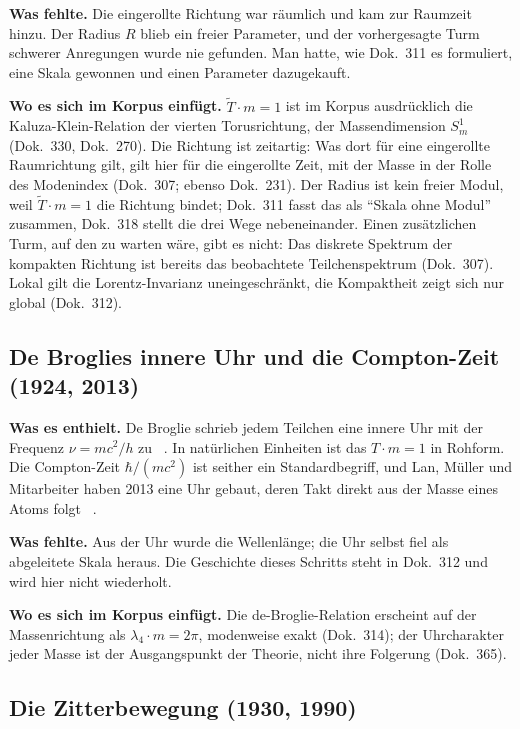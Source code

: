 \textbf{Was fehlte.} Die eingerollte Richtung war räumlich und kam zur Raumzeit hinzu. Der Radius
$R$ blieb ein freier Parameter, und der vorhergesagte Turm schwerer Anregungen wurde nie gefunden.
Man hatte, wie Dok.~311 es formuliert, eine Skala gewonnen und einen Parameter dazugekauft.

\textbf{Wo es sich im Korpus einfügt.} $\tilde T\cdot m=1$ ist im Korpus ausdrücklich die
Kaluza-Klein-Relation der vierten Torusrichtung, der Massendimension $S^1_m$ (Dok.~330, Dok.~270).
Die Richtung ist zeitartig: Was dort für eine eingerollte Raumrichtung gilt, gilt hier für die
eingerollte Zeit, mit der Masse in der Rolle des Modenindex (Dok.~307; ebenso Dok.~231). Der
Radius ist kein freier Modul, weil $\tilde T\cdot m=1$ die Richtung bindet; Dok.~311 fasst das als
\enquote{Skala ohne Modul} zusammen, Dok.~318 stellt die drei Wege nebeneinander. Einen
zusätzlichen Turm, auf den zu warten wäre, gibt es nicht: Das diskrete Spektrum der kompakten
Richtung ist bereits das beobachtete Teilchenspektrum (Dok.~307). Lokal gilt die
Lorentz-Invarianz uneingeschränkt, die Kompaktheit zeigt sich nur global (Dok.~312).

\subsection{De Broglies innere Uhr und die Compton-Zeit (1924, 2013)}

\textbf{Was es enthielt.} De Broglie schrieb jedem Teilchen eine innere Uhr mit der Frequenz
$\nu=mc^2/h$ zu \QM~\cite{deBroglie1925}. In natürlichen Einheiten ist das $T\cdot m=1$ in Rohform.
Die Compton-Zeit $\hbar/(mc^2)$ ist seither ein Standardbegriff, und Lan, Müller und Mitarbeiter
haben 2013 eine Uhr gebaut, deren Takt direkt aus der Masse eines Atoms folgt
\QM~\cite{Lan2013}.

\textbf{Was fehlte.} Aus der Uhr wurde die Wellenlänge; die Uhr selbst fiel als abgeleitete Skala
heraus. Die Geschichte dieses Schritts steht in Dok.~312 und wird hier nicht wiederholt.

\textbf{Wo es sich im Korpus einfügt.} Die de-Broglie-Relation erscheint auf der Massenrichtung als
$\lambda_4\cdot m=2\pi$, modenweise exakt (Dok.~314); der Uhrcharakter jeder Masse ist der
Ausgangspunkt der Theorie, nicht ihre Folgerung (Dok.~365).

\subsection{Die Zitterbewegung (1930, 1990)}

